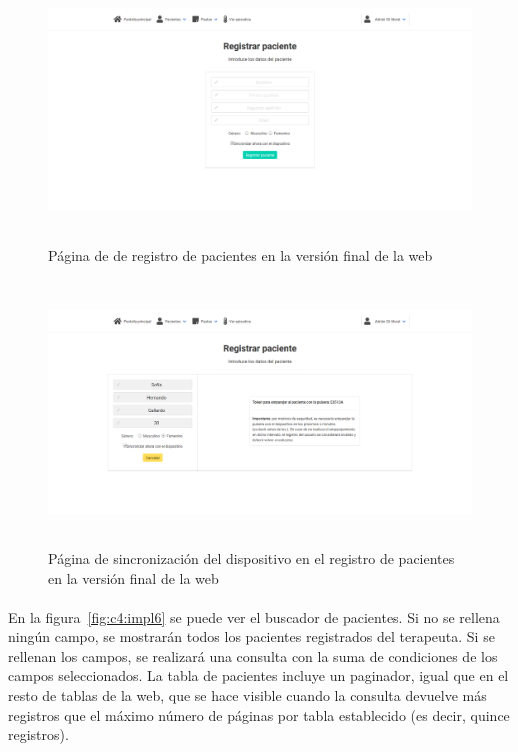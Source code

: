 \begin{figure}[H]
    \centering
    \includegraphics[height=7cm, width=\textwidth]{Imagenes/1-registrarPaciente.png}
    \caption[Página de registro de pacientes en la versión final de la web]{Página de de registro de pacientes en la versión final de la web}
    \label{fig:c4:impl4}
\end{figure}

\begin{figure}[H]
    \centering
    \includegraphics[height=7cm, width=\textwidth]{Imagenes/1-registrarPaciente-2.png}
    \caption[Página de sincronización del dispositivo en el registro de pacientes en la versión final de la web]{Página de sincronización del dispositivo en el registro de pacientes en la versión final de la web}
    \label{fig:c4:impl5}
\end{figure}

\paragraph{}
En la figura~\ref{fig:c4:impl6} se puede ver el buscador de pacientes. Si no se rellena ningún campo, se mostrarán todos los pacientes registrados del terapeuta. Si se rellenan los campos, se realizará una consulta con la suma de condiciones de los campos seleccionados. La tabla de pacientes incluye un paginador, igual que en el resto de tablas de la web, que se hace visible cuando la consulta devuelve más registros que el máximo número de páginas por tabla establecido (es decir, quince registros).

